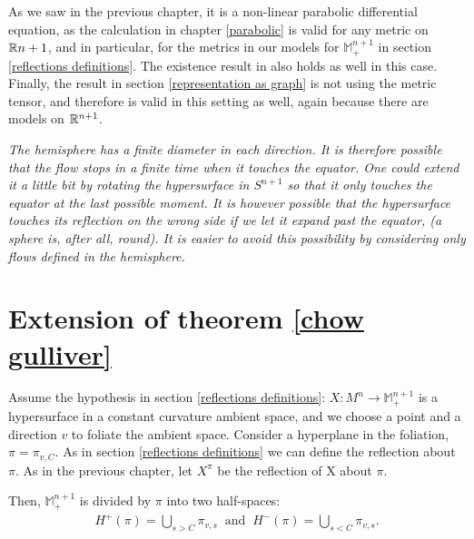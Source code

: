 As we saw in the previous chapter, it is a non-linear parabolic differential equation, as the calculation in chapter \ref{parabolic} is valid for any metric on $\mathbb{R}{n+1}$, and in particular, for the metrics in our models for $\mathbb{M}^{n+1}_+$ in section \ref{reflections definitions}. The existence result in \cite{huisken} also holds as well in this case. Finally, the result in section \ref{representation as graph} is not using the metric tensor, and therefore is valid in this setting as well, again because there are models on $\mathbb{R}^{n+1}$. 
\begin{oss}
	\em
	The hemisphere has a finite diameter in each direction. It is therefore possible that the flow stops in a finite time when it touches the equator. One could extend it a little bit by rotating the hypersurface in $S^{n+1}$ so that it only touches the equator at the last possible moment. It is however possible that the hypersurface touches its reflection {\em on the wrong side} if we let it expand past the equator, (a sphere is, after all, round). It is easier to avoid this possibility by considering only flows defined in the hemisphere. 
\end{oss}
\section{Extension of theorem \ref{chow gulliver}}	


Assume the hypothesis in section \ref{reflections definitions}: $X:M^n\rightarrow \mathbb{M}^{n+1}_+$ is a hypersurface in a constant curvature ambient space, and we choose a point and a direction $v$ to foliate the ambient space. Consider a hyperplane in the foliation, $\pi=\pi_{v, C}$. As in section \ref{reflections definitions} we can define the reflection about $\pi$. As in the previous chapter, let $X^\pi$ be the reflection of X about $\pi$.

Then, $\mathbb{M}^{n+1}_+$ is divided by $\pi$ into two half-spaces:
\begin{align*}
	H^+(\pi)= \bigcup_{s>C} \pi_{v, s} \;\;\mathrm{and}\;\;	H^-(\pi)= \bigcup_{s<C} \pi_{v, s}.
\end{align*} 

